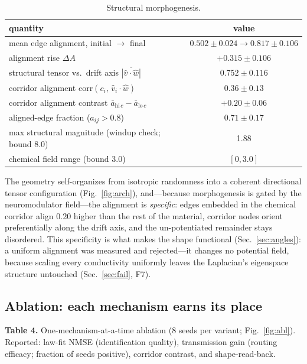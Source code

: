 \documentclass[11pt]{article}
\begin{document}
\begin{table}[h]
\centering
\caption{Structural morphogenesis.}
\begin{tabular}{lc}
\toprule
quantity & value \\
\midrule
mean edge alignment, initial $\to$ final & $0.502 \pm 0.024 \to 0.817 \pm 0.106$ \\
alignment rise $\Delta A$ & $+0.315 \pm 0.106$ \\
structural tensor vs.\ drift axis $\overline{|\hat v \cdot \hat w|}$ & $0.752 \pm 0.116$ \\
corridor alignment $\mathrm{corr}(c_i,\, \hat v_i \cdot \hat w)$ & $0.36 \pm 0.13$ \\
corridor alignment contrast $\bar a_{\mathrm{hi\,}c} - \bar a_{\mathrm{lo\,}c}$ & $+0.20 \pm 0.06$ \\
aligned-edge fraction ($a_{ij} > 0.8$) & $0.71 \pm 0.17$ \\
max structural magnitude (windup check; bound 8.0) & 1.88 \\
chemical field range (bound 3.0) & $[0, 3.0]$ \\
\bottomrule
\end{tabular}
\end{table}

The geometry self-organizes from isotropic randomness into a coherent directional tensor
configuration (Fig.~\ref{fig:arch}), and---because morphogenesis is gated by the
neuromodulator field---the alignment is \emph{specific}: edges embedded in the chemical
corridor align 0.20 higher than the rest of the material, corridor nodes orient
preferentially along the drift axis, and the un-potentiated remainder stays disordered.
This specificity is what makes the shape functional (Sec.~\ref{sec:angles}): a uniform
alignment was measured and rejected---it changes no potential field, because scaling
every conductivity uniformly leaves the Laplacian's eigenspace structure untouched
(Sec.~\ref{sec:fail}, F7).

\subsection{Ablation: each mechanism earns its place}
\textbf{Table 4.} One-mechanism-at-a-time ablation (8 seeds per variant;
Fig.~\ref{fig:abl}). Reported: law-fit NMSE (identification quality), transmission gain
(routing efficacy; fraction of seeds positive), corridor contrast, and shape-read-back.
\end{document}
